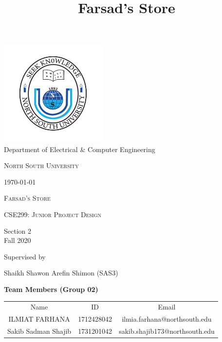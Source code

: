 \documentclass[12pt]{article}
\title{Farsad's Store}
\begin{document}
\begin{titlepage}
    \begin{center}
        \includegraphics[width=0.4\textwidth]{NSU.png} \\
        Department of Electrical \& Computer Engineering\\
        {\scshape\LARGE North South University \par}
        \today
        \vspace{1cm}
        
        {\scshape\Large Farsad's Store\par}
 
        \vspace{0.5cm}
        {\scshape\Large CSE299: Junior Project Design\par}
        Section 2 \\ Fall 2020
             
        \vspace{0.5cm}
        Supervised by\par
	    Shaikh Shawon Arefin Shimon (SAS3) \par
        \vspace{0.5cm}
        \textbf{Team Members (Group 02)} \par
        \begin{tabular}{c c c}
            Name & ID & Email \\
            ILMIAT FARHANA & 1712428042 & ilmia.farhana@northsouth.edu \\
            Sakib Sadman Shajib & 1731201042 & sakib.shajib173@northsouth.edu \\
        \end{tabular}

        \vfill
             
    \end{center}
\end{titlepage}
\end{document}
